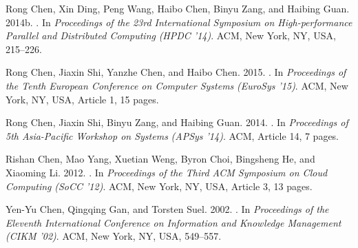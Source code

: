 \documentclass[reprint,twocolumn,showpacs,preprintnumbers,amsmath, aps,pre,amssymb]{revtex4-1}
\begin{document}
\begin{thebibliography}{00}
{
{Rong Chen}, {Xin Ding}, {Peng Wang}, {Haibo Chen}, {Binyu Zang}, {and}
  {Haibing Guan}. 2014b.
\newblock {}. In {\em Proceedings of the 23rd
  International Symposium on High-performance Parallel and Distributed
  Computing} {\em (HPDC '14)}. ACM, New York, NY, USA, 215--226.
\newblock
{}


{Rong Chen}, {Jiaxin Shi}, {Yanzhe Chen}, {and} {Haibo Chen}. 2015.
\newblock {}. In {\em Proceedings of the Tenth European
  Conference on Computer Systems} {\em (EuroSys '15)}. ACM, New York, NY, USA,
  Article 1, 15 pages.
\newblock
{}


{Rong Chen}, {Jiaxin Shi}, {Binyu Zang}, {and} {Haibing Guan}. 2014.
\newblock {}. In {\em Proceedings of 5th Asia-Pacific Workshop on
  Systems} {\em (APSys '14)}. ACM, Article 14, 7 pages.
\newblock
{}


{Rishan Chen}, {Mao Yang}, {Xuetian Weng}, {Byron Choi}, {Bingsheng He}, {and}
  {Xiaoming Li}. 2012.
\newblock {}. In {\em Proceedings of the Third ACM Symposium on Cloud
  Computing} {\em (SoCC '12)}. ACM, New York, NY, USA, Article 3, 13 pages.
\newblock
{}


{Yen-Yu Chen}, {Qingqing Gan}, {and} {Torsten Suel}. 2002.
\newblock {}.
  In {\em Proceedings of the Eleventh International Conference on Information
  and Knowledge Management} {\em (CIKM '02)}. ACM, New York, NY, USA, 549--557.
\newblock
{}


}
\end{thebibliography}
\end{document}
